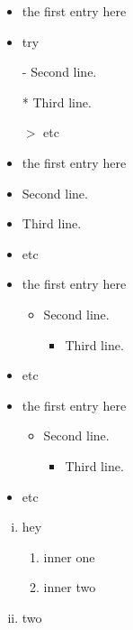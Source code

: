 \documentclass{article}
\renewcommand{\labelitemi}{$\bullet$} %
\begin{document}
\begin{itemize}
\item the first entry here
\item try
\item[-] Second line.
\item[*] Third line.
\item[$>$] etc
\end{itemize}

\renewcommand{\labelitemi}{\textgreater}

\begin{itemize}
\item the first entry here
\item Second line.
\item Third line.
\item etc
\end{itemize}

\renewcommand{\labelitemi}{$\bullet$}
\begin{itemize}
\item the first entry here
\begin{itemize}
\item Second line.
\begin{itemize}
\item Third line.
\end{itemize}
\end{itemize}
\item etc
\end{itemize}

\renewcommand{\labelitemi}{\textgreater}
\renewcommand{\labelitemii}{$\star$}
\renewcommand{\labelitemiii}{$\bullet$}
\begin{itemize}
\item the first entry here
\begin{itemize}
\item Second line.
\begin{itemize}
\item Third line.
\end{itemize}
\end{itemize}
\item etc
\end{itemize}

\begin{enumerate}[(i)]
\item hey
\begin{enumerate}[1]
\item inner one
\item inner two
\end{enumerate}
\item two
\end{enumerate}
\end{document}
